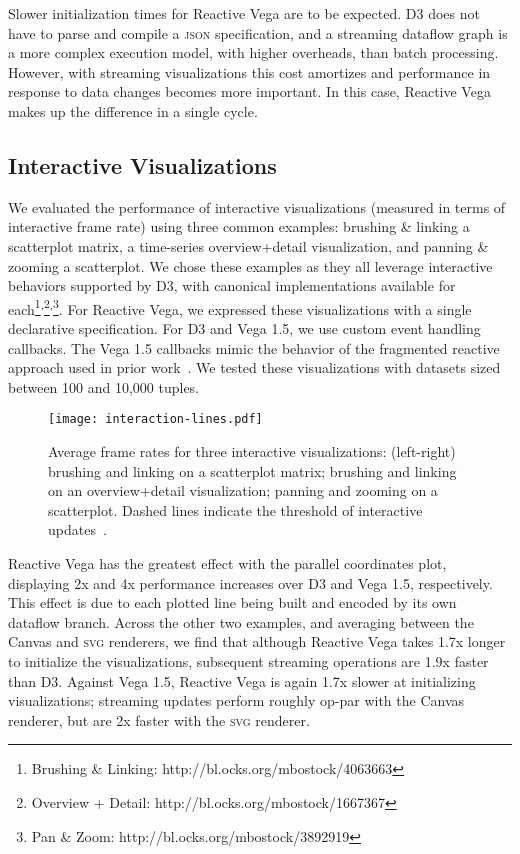 Slower initialization times for Reactive Vega are to be expected. D3 does not
have to parse and compile a \textsc{json} specification, and a streaming
dataflow graph is a more complex execution model, with higher overheads, than
batch processing. However, with streaming visualizations this cost amortizes and
performance in response to data changes becomes more important. In this case,
Reactive Vega makes up the difference in a single cycle.

\vspace{-10pt}

\subsection{Interactive Visualizations}

\vspace{-7pt}

We evaluated the performance of interactive visualizations (measured in terms of
interactive frame rate) using three common examples: brushing \& linking a
scatterplot matrix, a time-series overview+detail visualization, and panning \&
zooming a scatterplot. We chose these examples as they all leverage interactive
behaviors supported by D3, with canonical implementations available for
each\footnote{Brushing \& Linking:
http://bl.ocks.org/mbostock/4063663}\textsuperscript{,}\footnote{Overview +
Detail: http://bl.ocks.org/mbostock/1667367}\textsuperscript{,}\footnote{Pan \&
Zoom: http://bl.ocks.org/mbostock/3892919}. For Reactive Vega, we expressed
these visualizations with a single declarative specification. For D3 and Vega
1.5, we use custom event handling callbacks. The Vega 1.5 callbacks mimic the
behavior of the fragmented reactive approach used in prior
work~\cite{reactive-vega-model}. We tested these visualizations with
datasets sized between 100 and 10,000 tuples.

\begin{figure}[t!]
  \centering
  \texttt{[image: interaction-lines.pdf]}
  \caption{Average frame rates for three interactive visualizations: (left-right)
  brushing and linking on a scatterplot matrix; brushing and linking on an
  overview+detail visualization; panning and zooming on a scatterplot. Dashed
  lines indicate the threshold of interactive updates~\cite{card:modelhuman}.}
  \label{fig:vg:interactive_benchmark}
\end{figure}

Reactive Vega has the greatest effect with the parallel coordinates plot,
displaying 2x and 4x performance increases over D3 and Vega 1.5, respectively.
This effect is due to each plotted line being built and encoded by its own
dataflow branch. Across the other two examples, and averaging between the Canvas
and \textsc{svg} renderers, we find that although Reactive Vega takes 1.7x
longer to initialize the visualizations, subsequent streaming operations are
1.9x faster than D3. Against Vega 1.5, Reactive Vega is again 1.7x slower at
initializing visualizations; streaming updates perform roughly op-par with the
Canvas renderer, but are 2x faster with the \textsc{svg} renderer.